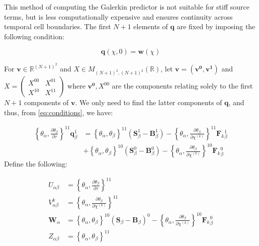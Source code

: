 \documentclass[twoside,english,final,5p,times,twocolumn]{elsarticle}
\begin{document}
This method of computing the Galerkin predictor is not suitable for
stiff source terms, but is less computationally expensive and ensures
continuity across temporal cell boundaries. The first $N+1$ elements
of $\boldsymbol{q}$ are fixed by imposing the following condition:

\begin{equation}
\boldsymbol{q}\left(\chi,0\right)=\boldsymbol{w}\left(\chi\right)
\end{equation}

For $\boldsymbol{v}\in\mathbb{R}^{\left(N+1\right)^{2}}$ and $X\in M_{\left(N+1\right)^{2},\left(N+1\right)^{2}}\left(\mathbb{R}\right)$,
let $\boldsymbol{v}=\left(\boldsymbol{v^{0}},\boldsymbol{v^{1}}\right)$
and $X=\left(\begin{array}{cc}
X^{00} & X^{01}\\
X^{10} & X^{11}
\end{array}\right)$ where $\boldsymbol{v^{0}},X^{00}$ are the components relating solely
to the first $N+1$ components of $\boldsymbol{v}$. We only need
to find the latter components of $\boldsymbol{q}$, and thus, from
\eqref{eq:conditions}, we have:

\begin{align}
\left\{ \theta_{\alpha},\frac{\partial\theta_{\beta}}{\partial\tau}\right\} ^{11}\boldsymbol{q}_{\beta}^{1} & =\left\{ \theta_{\alpha},\theta_{\beta}\right\} ^{11}\left(\boldsymbol{S}_{\beta}^{1}-\boldsymbol{B}_{\beta}^{1}\right)-\left\{ \theta_{\alpha},\frac{\partial\theta_{\beta}}{\partial\chi^{\left(k\right)}}\right\} ^{11}\boldsymbol{F}_{k}{}_{\beta}^{1}\\
 & +\left\{ \theta_{\alpha},\theta_{\beta}\right\} ^{10}\left(\boldsymbol{S}_{\beta}^{0}-\boldsymbol{B}_{\beta}^{0}\right)-\left\{ \theta_{\alpha},\frac{\partial\theta_{\beta}}{\partial\chi^{\left(k\right)}}\right\} ^{10}\boldsymbol{F}_{k}{}_{\beta}^{0}\nonumber 
\end{align}
Define the following:

\begin{subequations}

\begin{align}
U_{\alpha\beta} & =\left\{ \theta_{\alpha},\frac{\partial\theta_{\beta}}{\partial\tau}\right\} ^{11}\\
V_{\alpha\beta}^{k} & =\left\{ \theta_{\alpha},\frac{\partial\theta_{\beta}}{\partial\chi^{\left(k\right)}}\right\} ^{11}\\
\boldsymbol{W}_{\alpha} & =\left\{ \theta_{\alpha},\theta_{\beta}\right\} ^{10}\left(\boldsymbol{S}_{\beta}-\boldsymbol{B}_{\beta}\right)^{0}-\left\{ \theta_{\alpha},\frac{\partial\theta_{\beta}}{\partial\chi^{\left(k\right)}}\right\} ^{10}\boldsymbol{F}_{k}{}_{\beta}^{0}\\
Z_{\alpha\beta} & =\left\{ \theta_{\alpha},\theta_{\beta}\right\} ^{11}
\end{align}

\end{subequations}
\end{document}
